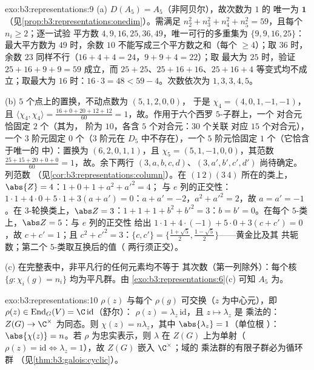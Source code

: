 \begin{solution}{exo:b3:representations:9}
(a) $D(A_5) = A_5$（非阿贝尔），故次数为 $1$ 的
唯一为 $\mathbf 1$
（见\cref{prop:b3:representations:onedim}）。需满足 $n_2^2 + n_3^2
+ n_4^2 + n_5^2 = 59$，且每个 $n_i \geq 2$；逐一试验
平方数 $4, 9, 16, 25, 36, 49$，唯一可行的多重集为
$\{9, 9, 16, 25\}$：最大平方数为 $49$ 时，余数 $10$
不能写成三个平方数之和（每个 $\geq 4$）；取 $36$ 时，余数
$23$ 同样不行（$16 + 4 + 4 = 24$，$9 + 9 + 4 = 22$）；取
最大为 $25$ 时，验证 $25 + 16 + 9 + 9 = 59$ 成立，而 $25 +
25$、$25 + 16 + 16$、$25 + 16 + 4$ 等变式均不成立；取最大为
$16$ 时：$16\cdot3 = 48 < 59 - 4$。次数依次为 $1, 3, 3, 4, 5$。

(b) $5$ 个点上的置换，不动点数为 $(5, 1, 2, 0, 0)$，
于是 $\chi_4 = (4, 0, 1, -1, -1)$，且
$\langle\chi_4,\chi_4\rangle = \frac{16 + 0 + 20 + 12 + 12}{60}
= 1$，故。作用于六个西罗 $5$-子群上，一个
对合元恰固定 $2$ 个（其为，
阶为 $10$，各含 $5$ 个对合元：$30$ 个关联
对应 $15$ 个对合元），一个 $3$ 阶元固定 $0$ 个（$3$ 阶元在
$D_5$ 中不存在），一个 $5$ 阶元恰固定 $1$ 个（它恰含于唯一的
中）：置换为 $(6, 2, 0, 1, 1)$，且 $\chi_5 =
(5, 1, -1, 0, 0)$，其范数 $\frac{25 + 15 + 20 + 0 + 0}{60} =
1$，故。余下两行 $(3, a, b, c, d)$、$(3, a', b', c',
d')$ 尚待确定。列范数
（见\cref{cor:b3:representations:column}）。在
$(1\,2)(3\,4)$ 所在的类上，$\abs{Z} = 4$：$1 + 0 + 1 + a^2 + a'^2 = 4$；
与 $e$ 列的正交性：$1\cdot1 + 4\cdot 0 + 5\cdot1 + 3(a + a') =
0$：$a + a' = -2$，$a^2 + a'^2 = 2$，故 $a = a' = -1$。在
$3$-轮换类上，$\abs Z = 3$：$1 + 1 + 1 + b^2 + b'^2 = 3$：$b = b'
= 0$。在每个 $5$-类上，$\abs Z = 5$：与 $e$ 列的正交性
给出 $1\cdot 1 + 4\cdot(-1) + 5\cdot 0 + 3(c + c') = 0$，故
$c + c' = 1$；且
$c^2 + c'^2 = 3$：$\{c, c'\} = \bigl\{\frac{1+\sqrt5}2,
\frac{1-\sqrt5}2\bigr\}$——黄金比及其
共轭数；第二个 $5$-类取互换后的值（
两行须正交）。

(c) 在完整表中，非平凡行的任何元素均不等于
其次数（第一列除外）：每个核 $\{g :
\chi_i(g) = n_i\}$ 均为平凡群。由
\cref{exo:b3:representations:6}(c) 可知 $A_5$ 为。
\end{solution}

\begin{solution}{exo:b3:representations:10}
$\rho(z)$ 与每个 $\rho(g)$ 可交换（$z$ 为中心元），即\
$\rho(z) \in \operatorname{End}_G(V) = \C\,\mathrm{id}$（舒尔）：
$\rho(z) = \lambda_z\,\mathrm{id}$，且 $z \mapsto \lambda_z$ 是
乘法的：$Z(G) \to \C^\times$ 为同态。则
$\chi(z) = n\lambda_z$，其中 $\abs{\lambda_z} = 1$（单位根
）：$\abs{\chi(z)} = n$。若 $\rho$ 为忠实表示，则 $\lambda$ 在
$Z(G)$ 上为单射（$\rho(z) = \mathrm{id} \iff \lambda_z =
1$），故 $Z(G)$ 嵌入 $\C^\times$；域的
乘法群的有限子群必为循环群
（见\cref{thm:b3:galois:cyclic}）。
\end{solution}

